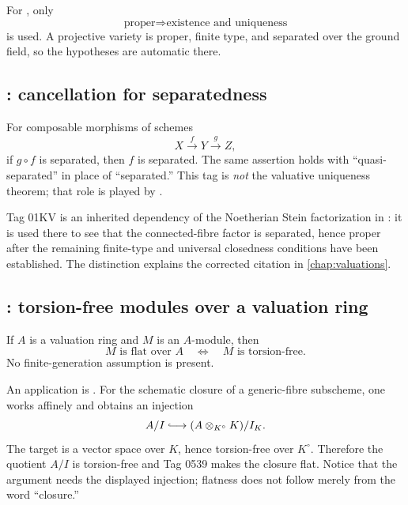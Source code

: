 For , only
\[
                         \text{proper}\Longrightarrow
                         \text{existence and uniqueness}
\]
is used. A projective variety is proper, finite type, and separated over
the ground field, so the hypotheses are automatic there.

\subsection*{: cancellation for separatedness}
\label{sec:stacks-tag-01KV}

For composable morphisms of schemes
\[
                         X\xrightarrow{f}Y\xrightarrow{g}Z,
\]
if \(g\circ f\) is separated, then \(f\) is separated. The same assertion
holds with “quasi-separated” in place of “separated.” This tag is
\emph{not} the valuative uniqueness theorem; that role is played by
.

Tag 01KV is an inherited dependency of the Noetherian Stein factorization
in : it is used there to see that the connected-fibre factor
is separated, hence proper after the remaining finite-type and universal
closedness conditions have been established. The distinction explains the
corrected citation in \cref{chap:valuations}.

\subsection*{: torsion-free modules over a valuation ring}
\label{sec:stacks-tag-0539}

If \(A\) is a valuation ring and \(M\) is an \(A\)-module, then
\[
                         M\text{ is flat over }A
                         \quad\Longleftrightarrow\quad
                         M\text{ is torsion-free}.
\]
No finite-generation assumption is present.

An application is .
For the schematic closure of a generic-fibre subscheme, one works affinely
and obtains an injection
\[
              A/I\lhook\joinrel\longrightarrow
              (A\otimes_{K^\circ}K)/I_K.
\]
The target is a vector space over \(K\), hence torsion-free over
\(K^\circ\). Therefore the quotient \(A/I\) is torsion-free and Tag 0539
makes the closure flat. Notice that the argument needs the displayed
injection; flatness does not follow merely from the word “closure.”

